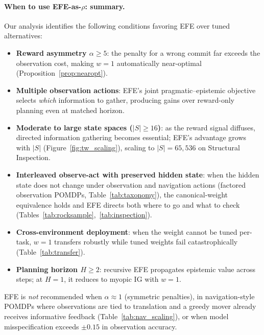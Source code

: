 \documentclass{article}
\begin{document}
\paragraph{When to use EFE-as-$\rho$: summary.}
Our analysis identifies the following conditions favoring EFE over tuned alternatives:
\begin{itemize}[leftmargin=1.5em,itemsep=1pt,topsep=2pt]
\item \textbf{Reward asymmetry $\alpha \geq 5$}: the penalty for a wrong commit far exceeds the observation cost, making $w{=}1$ automatically near-optimal (Proposition~\ref{prop:nearopt}).
\item \textbf{Multiple observation actions}: EFE's joint pragmatic--epistemic objective selects \emph{which} information to gather, producing gains over reward-only planning even at matched horizon.
\item \textbf{Moderate to large state spaces ($|S| \geq 16$)}: as the reward signal diffuses, directed information gathering becomes essential; EFE's advantage grows with $|S|$ (Figure~\ref{fig:tw_scaling}), scaling to $|S|{=}65{,}536$ on Structural Inspection.
\item \textbf{Interleaved observe-act with preserved hidden state}: when the hidden state does not change under observation and navigation actions (factored observation POMDPs, Table~\ref{tab:taxonomy}), the canonical-weight equivalence holds and EFE directs both where to go and what to check (Tables~\ref{tab:rocksample},~\ref{tab:inspection}).
\item \textbf{Cross-environment deployment}: when the weight cannot be tuned per-task, $w{=}1$ transfers robustly while tuned weights fail catastrophically (Table~\ref{tab:transfer}).
\item \textbf{Planning horizon $H \geq 2$}: recursive EFE propagates epistemic value across steps; at $H{=}1$, it reduces to myopic IG with $w{=}1$.
\end{itemize}
EFE is \emph{not} recommended when $\alpha \approx 1$ (symmetric penalties), in navigation-style POMDPs where observations are tied to translation and a greedy mover already receives informative feedback (Table~\ref{tab:nav_scaling}), or when model misspecification exceeds $\pm 0.15$ in observation accuracy.
\end{document}

